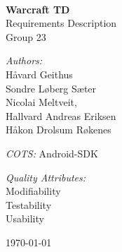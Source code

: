 \begin{titlepage}
\begin{center}

\vspace{10 mm}
\HRule \\[0.4cm]
{ \huge\bfseries Warcraft TD}\\[0.4cm]
Requirements Description\\
Group 23
\HRule \\[1.5cm]

\vfill
\begin{minipage}{0.4\textwidth}
\begin{flushleft} \large
\emph{Authors:}\\
Håvard Geithus\\ 
Sondre Løberg Sæter\\ 
Nicolai Meltveit,\\
Hallvard Andreas Eriksen\\
Håkon Drolsum Røkenes\\
\end{flushleft}
\end{minipage}
\begin{minipage}{0.4\textwidth}
\begin{flushright} \large
\emph{COTS:} Android-SDK \vspace{5 mm}

\emph{Quality Attributes:} \\

Modifiability\\ Testability\\ Usability
\end{flushright}
\end{minipage}
\vspace{10 mm}








{\large \today}



\end{center}
\end{titlepage}
